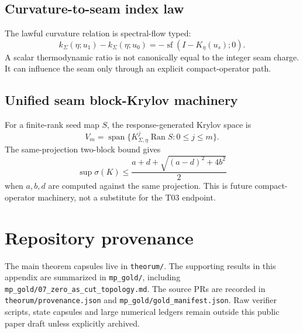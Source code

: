 \documentclass[11pt]{article}
\newcommand{\kSigma}{k_\Sigma}
\begin{document}
\subsection{Curvature-to-seam index law}

The lawful curvature relation is spectral-flow typed:
\[
\kSigma(\eta;u_1)-\kSigma(\eta;u_0)
=-\operatorname{sf}(I-K_\eta(u_s);0).
\]
A scalar thermodynamic ratio is not canonically equal to the integer seam charge.  It can influence the seam only through an explicit compact-operator path.

\subsection{Unified seam block-Krylov machinery}

For a finite-rank seed map \(S\), the response-generated Krylov space is
\[
V_m=\operatorname{span}\{K_{\Sigma,\eta}^j\operatorname{Ran}S:0\le j\le m\}.
\]
The same-projection two-block bound gives
\[
\sup\sigma(K)
\le
\frac{a+d+\sqrt{(a-d)^2+4b^2}}{2}
\]
when \(a,b,d\) are computed against the same projection.  This is future compact-operator machinery, not a substitute for the T03 endpoint.

\section{Repository provenance}

The main theorem capsules live in \texttt{theorum/}.  The supporting results in this appendix are summarized in \texttt{mp\_gold/}, including \texttt{mp\_gold/07\_zero\_as\_cut\_topology.md}.  The source PRs are recorded in \texttt{theorum/provenance.json} and \texttt{mp\_gold/gold\_manifest.json}.  Raw verifier scripts, state capsules and large numerical ledgers remain outside this public paper draft unless explicitly archived.
\end{document}
